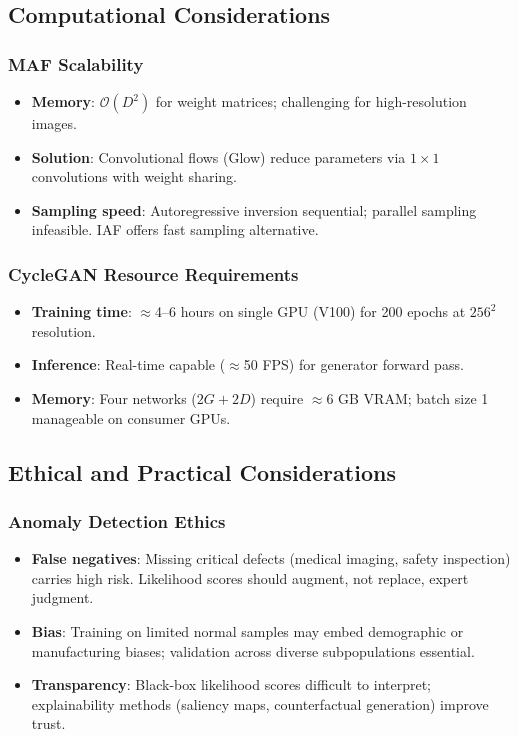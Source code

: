 \documentclass[conference]{IEEEtran}
\begin{document}
\subsection{Computational Considerations}
\subsubsection{MAF Scalability}
\begin{itemize}
\item \textbf{Memory}: $\mathcal{O}(D^2)$ for weight matrices; challenging for high-resolution images.
\item \textbf{Solution}: Convolutional flows (Glow) reduce parameters via $1 \times 1$ convolutions with weight sharing.
\item \textbf{Sampling speed}: Autoregressive inversion sequential; parallel sampling infeasible. IAF offers fast sampling alternative.
\end{itemize}

\subsubsection{CycleGAN Resource Requirements}
\begin{itemize}
\item \textbf{Training time}: $\approx$4–6 hours on single GPU (V100) for 200 epochs at $256^2$ resolution.
\item \textbf{Inference}: Real-time capable ($\approx$50 FPS) for generator forward pass.
\item \textbf{Memory}: Four networks ($2G + 2D$) require $\approx$6 GB VRAM; batch size 1 manageable on consumer GPUs.
\end{itemize}

\subsection{Ethical and Practical Considerations}
\subsubsection{Anomaly Detection Ethics}
\begin{itemize}
\item \textbf{False negatives}: Missing critical defects (medical imaging, safety inspection) carries high risk. Likelihood scores should augment, not replace, expert judgment.
\item \textbf{Bias}: Training on limited normal samples may embed demographic or manufacturing biases; validation across diverse subpopulations essential.
\item \textbf{Transparency}: Black-box likelihood scores difficult to interpret; explainability methods (saliency maps, counterfactual generation) improve trust.
\end{itemize}
\end{document}
